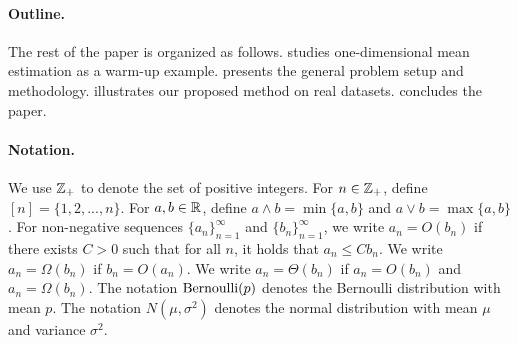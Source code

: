 \paragraph{Outline.} The rest of the paper is organized as follows.  studies one-dimensional mean estimation as a warm-up example.  presents the general problem setup and methodology.  illustrates our proposed method on real datasets.  concludes the paper.

\paragraph{Notation.} We use $\mathbb{Z}_+$ to denote the set of positive integers. For $n\in\mathbb{Z}_+$, define $[n]=\{1,2,...,n\}$. For $a,b\in\mathbb{R}$, define $a\wedge b = \min\{a,b\}$ and $a\vee b = \max\{a,b\}$. For non-negative sequences $\{a_n\}_{n=1}^{\infty}$ and $\{b_n\}_{n=1}^{\infty}$, we write $a_n=O(b_n)$ if there exists $C>0$ such that for all $n$, it holds that $a_n \le C b_n$. We write $a_n = \Omega(b_n)$ if $b_n = O(a_n)$. We write $a_n = \Theta(b_n)$ if $a_n=O(b_n)$ and $a_n=\Omega(b_n)$. The notation $\mathrm{Bernoulli}(p)$ denotes the Bernoulli distribution with mean $p$. The notation $N(\mu,\sigma^2)$ denotes the normal distribution with mean $\mu$ and variance $\sigma^2$.
